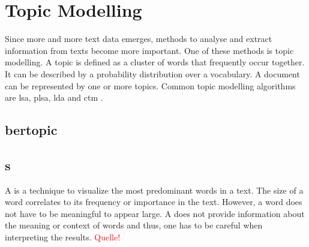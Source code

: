 \section{Topic Modelling}\label{sec:topic-modelling}

Since more and more text data emerges, methods to analyse and extract information from texts become more important.
One of these methods is topic modelling.
A topic is defined as a cluster of words that frequently occur together.
It can be described by a probability distribution over a vocabulary.
A document can be represented by one or more topics. %
Common topic modelling algorithms are \ac{lsa}, \ac{plsa}, \ac{lda} and \ac{ctm} \cite{topic_modeling2015}.




\subsection{\ac{bertopic}}\label{subsec:bertopic}







\subsection{\wordcloud{}s}\label{subsec:word-clouds}

A \wordcloud{} is a technique to visualize the most predominant words in a text.
The size of a word correlates to its frequency or importance in the text.
However, a word does not have to be meaningful to appear large.
A \wordcloud{} does not provide information about the meaning or context of words and thus, 
one has to be careful when interpreting the results.
\textcolor{red}{Quelle!}